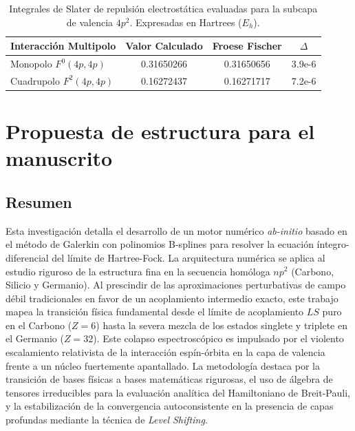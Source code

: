 \documentclass[12pt,a4paper]{book}
\begin{document}
\begin{table}[htbp]
    \centering
    \caption{Integrales de Slater de repulsión electrostática evaluadas para la subcapa de valencia $4p^2$. Expresadas en Hartrees ($E_h$).}
    \label{tab:slater_integrals}
    \begin{tabular}{l S[table-format=1.8] S[table-format=1.8] S[table-format=1.2e-1]}
        \toprule
        \textbf{Interacción Multipolo} & {\textbf{Valor Calculado}} & {\textbf{Froese Fischer}} & {\textbf{$\Delta$}} \\
        \midrule
        Monopolo $F^0(4p, 4p)$   & 0.31650266 & 0.31650656 & 3.9e-6 \\
        Cuadrupolo $F^2(4p, 4p)$ & 0.16272437 & 0.16271717 & 7.2e-6 \\
        \bottomrule
    \end{tabular}
\end{table}



\chapter{Propuesta de estructura para el manuscrito}

\section*{Resumen}
Esta investigación detalla el desarrollo de un motor numérico \textit{ab-initio} basado en el método de Galerkin con polinomios B-splines para resolver la ecuación íntegro-diferencial del límite de Hartree-Fock. La arquitectura numérica se aplica al estudio riguroso de la estructura fina en la secuencia homóloga $np^2$ (Carbono, Silicio y Germanio). Al prescindir de las aproximaciones perturbativas de campo débil tradicionales en favor de un acoplamiento intermedio exacto, este trabajo mapea la transición física fundamental desde el límite de acoplamiento $LS$ puro en el Carbono ($Z=6$) hasta la severa mezcla de los estados singlete y triplete en el Germanio ($Z=32$). Este colapso espectroscópico es impulsado por el violento escalamiento relativista de la interacción espín-órbita en la capa de valencia frente a un núcleo fuertemente apantallado. La metodología destaca por la transición de bases físicas a bases matemáticas rigurosas, el uso de álgebra de tensores irreducibles para la evaluación analítica del Hamiltoniano de Breit-Pauli, y la estabilización de la convergencia autoconsistente en la presencia de capas profundas mediante la técnica de \textit{Level Shifting}.
\end{document}
